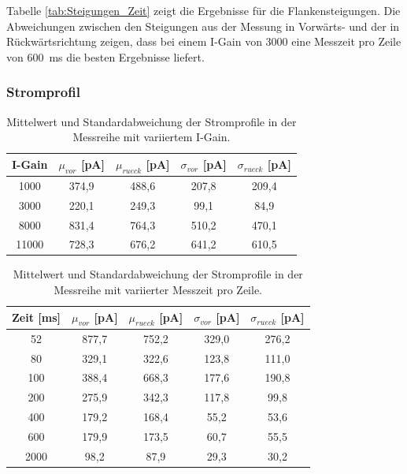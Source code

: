 \documentclass[12pt,a4paper]{article}
\begin{document}
Tabelle \ref{tab:Steigungen_Zeit} zeigt die Ergebnisse für die Flankensteigungen. Die Abweichungen zwischen den Steigungen aus der Messung in Vorwärts- und der in Rückwärtsrichtung zeigen, dass bei einem I-Gain von 3000 eine Messzeit pro Zeile von \SI{600}{ms} die besten Ergebnisse liefert.
\newpage
\subsubsection{Stromprofil}

\begin{table}
\centering
\begin{tabular}{|c|c|c|c|c|}
\hline 
I-Gain & $\mu_{vor}$ [pA] & $\mu_{rueck}$ [pA] & $\sigma_{vor}$ [pA] & $\sigma_{rueck}$ [pA] \\ 
\hline 
1000 & 374,9 & 488,6 & 207,8 & 209,4 \\
\hline 
3000 & 220,1 & 249,3 & 99,1 & 84,9 \\ 
\hline 
8000 & 831,4 & 764,3 & 510,2 & 470,1 \\
\hline 
11000 & 728,3 & 676,2 & 641,2 & 610,5 \\
\hline 
\end{tabular} 
\caption{Mittelwert und Standardabweichung der Stromprofile in der Messreihe mit variiertem I-Gain.}
\label{tab:Strom_IGain}
\end{table}

\begin{table}
\centering
\begin{tabular}{|c|c|c|c|c|}
\hline 
Zeit [ms] & $\mu_{vor}$ [pA] & $\mu_{rueck}$ [pA] & $\sigma_{vor}$ [pA] & $\sigma_{rueck}$ [pA] \\ 
\hline 
52 & 877,7 & 752,2 & 329,0 & 276,2 \\
\hline 
80 & 329,1 & 322,6 & 123,8 & 111,0 \\ 
\hline 
100 & 388,4 & 668,3 & 177,6 & 190,8 \\
\hline 
200 & 275,9 & 342,3 & 117,8 & 99,8 \\
\hline 
400 & 179,2 & 168,4 & 55,2 & 53,6 \\
\hline 
600 & 179,9 & 173,5 & 60,7 & 55,5 \\
\hline 
2000 & 98,2 & 87,9 & 29,3 & 30,2 \\
\hline 
\end{tabular} 
\caption{Mittelwert und Standardabweichung der Stromprofile in der Messreihe mit variierter Messzeit pro Zeile.}
\label{tab:Strom_Zeit}
\end{table}
\end{document}
